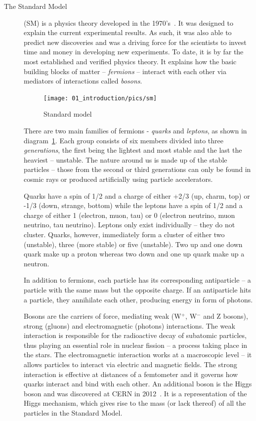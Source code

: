\begin{description}
\item[The Standard Model]
(SM) is a physics theory developed in the 1970's~\cite{Novaes:1999yn}. It was designed to explain the current experimental results. As such, it was also able to predict new discoveries and was a driving force for the scientists to invest time and money in developing new experiments. To date, it is by far the most established and verified physics theory. It explains how the basic building blocks of matter -- \emph{fermions} -- interact with each other via mediators of interactions called \emph{bosons}.  
\begin{figure}[!t]
\centering
\texttt{[image: 01\_introduction/pics/sm]}
\caption{Standard model \cite{Dominguez:2002395}}
\label{fig:sm}
\end{figure}
There are two main families of fermions - \emph{quarks} and \emph{leptons}, as shown in diagram~\ref{fig:sm}. Each group consists of six members divided into three \emph{generations}, the first being the lightest and most stable and the last the heaviest -- unstable. The nature around us is made up of the stable particles -- those from the second or third generations can only be found in cosmic rays or produced artificially using particle accelerators.

Quarks have a spin of 1/2 and a charge of either +2/3 (up, charm, top)  or -1/3  (down, strange, bottom) while the leptons have a spin of 1/2  and a charge of either 1 (electron, muon, tau) or 0 (electron neutrino, muon neutrino, tau neutrino). Leptons only exist individually -- they do not cluster. Quarks, however, immediately form a cluster of either two (unstable), three (more stable) or five (unstable). Two up and one down quark make up a proton whereas two down and one up quark make up a neutron.

In addition to fermions, each particle has its corresponding antiparticle -- a particle with the same mass but the opposite charge. If an antiparticle hits a particle, they annihilate each other, producing energy in form of photons. 

Bosons are the carriers of force, mediating weak (W$^+$, W$^-$ and Z bosons), strong (gluons) and electromagnetic (photons) interactions. The weak interaction is responsible for the radioactive decay of subatomic particles, thus playing an essential role in nuclear fission -- a process taking place in the stars. The electromagnetic interaction works at a macroscopic level -- it allows particles to interact via electric and magnetic fields. The strong interaction is effective at distances of a femtometer and it governs how quarks interact and bind with each other. An additional boson is the Higgs boson and was discovered at CERN in 2012~\cite{}. It is a representation of the Higgs mechanism, which gives rise to the mass (or lack thereof) of all the particles in the Standard Model.
\end{description}

